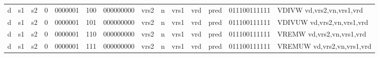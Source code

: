 \begin{landscape}
\begin{table}[p]
\begin{small}
\begin{center}
\begin{tabular}{p{0.08in}@{}p{0.08in}@{}p{0.08in}@{}p{0.08in}@{}p{0.50in}@{}p{0.30in}@{}p{0.08in}@{}p{0.8in}@{}p{0.48in}@{}p{0.32in}@{}p{0.08in}@{}p{0.8in}@{}p{0.8in}@{}p{0.4in}@{}p{0.56in}l}
\multicolumn{1}{|c|}{d} &
\multicolumn{1}{c|}{s1} &
\multicolumn{1}{c|}{s2} &
\multicolumn{1}{c|}{0} &
\multicolumn{1}{c|}{0000001} &
\multicolumn{1}{c|}{100} &
\multicolumn{2}{c|}{000000000} &
\multicolumn{2}{c|}{vrs2} &
\multicolumn{1}{c|}{n} &
\multicolumn{1}{c|}{vrs1} &
\multicolumn{1}{c|}{vrd} &
\multicolumn{1}{c|}{pred} &
\multicolumn{1}{c|}{011100111111} & VDIVW vd,vrs2,vn,vrs1,vrd \\
\cline{1-15}
  

\multicolumn{1}{|c|}{d} &
\multicolumn{1}{c|}{s1} &
\multicolumn{1}{c|}{s2} &
\multicolumn{1}{c|}{0} &
\multicolumn{1}{c|}{0000001} &
\multicolumn{1}{c|}{101} &
\multicolumn{2}{c|}{000000000} &
\multicolumn{2}{c|}{vrs2} &
\multicolumn{1}{c|}{n} &
\multicolumn{1}{c|}{vrs1} &
\multicolumn{1}{c|}{vrd} &
\multicolumn{1}{c|}{pred} &
\multicolumn{1}{c|}{011100111111} & VDIVUW vd,vrs2,vn,vrs1,vrd \\
\cline{1-15}
  

\multicolumn{1}{|c|}{d} &
\multicolumn{1}{c|}{s1} &
\multicolumn{1}{c|}{s2} &
\multicolumn{1}{c|}{0} &
\multicolumn{1}{c|}{0000001} &
\multicolumn{1}{c|}{110} &
\multicolumn{2}{c|}{000000000} &
\multicolumn{2}{c|}{vrs2} &
\multicolumn{1}{c|}{n} &
\multicolumn{1}{c|}{vrs1} &
\multicolumn{1}{c|}{vrd} &
\multicolumn{1}{c|}{pred} &
\multicolumn{1}{c|}{011100111111} & VREMW vd,vrs2,vn,vrs1,vrd \\
\cline{1-15}
  

\multicolumn{1}{|c|}{d} &
\multicolumn{1}{c|}{s1} &
\multicolumn{1}{c|}{s2} &
\multicolumn{1}{c|}{0} &
\multicolumn{1}{c|}{0000001} &
\multicolumn{1}{c|}{111} &
\multicolumn{2}{c|}{000000000} &
\multicolumn{2}{c|}{vrs2} &
\multicolumn{1}{c|}{n} &
\multicolumn{1}{c|}{vrs1} &
\multicolumn{1}{c|}{vrd} &
\multicolumn{1}{c|}{pred} &
\multicolumn{1}{c|}{011100111111} & VREMUW vd,vrs2,vn,vrs1,vrd \\
\cline{1-15}
  

\end{tabular}
\end{center}
\end{small}

\label{instr-table}
\end{table}
\end{landscape}
\restoregeometry
  

\newpage

